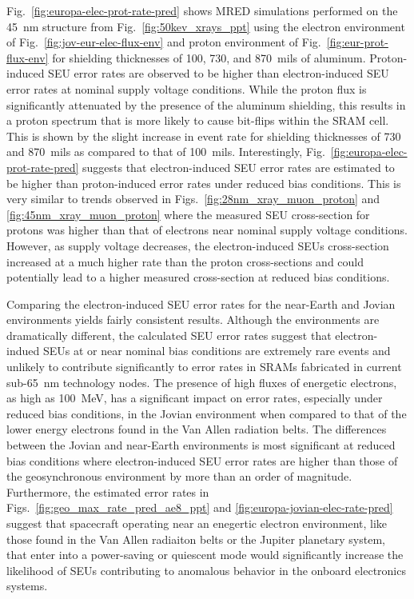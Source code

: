 Fig.~\ref{fig:europa-elec-prot-rate-pred} shows MRED simulations performed on the 45~nm structure from Fig.~\ref{fig:50kev_xrays_ppt} using the electron environment of Fig.~\ref{fig:jov-eur-elec-flux-env} and proton environment of Fig.~\ref{fig:eur-prot-flux-env} for shielding thicknesses of 100, 730, and 870~mils of aluminum.
Proton-induced SEU error rates are observed to be higher than electron-induced SEU error rates at nominal supply voltage conditions. 
While the proton flux is significantly attenuated by the presence of the aluminum shielding, this results in a proton spectrum that is more likely to cause bit-flips within the SRAM cell.
This is shown by the slight increase in event rate for shielding thicknesses of 730 and 870~mils as compared to that of 100~mils.
Interestingly, Fig.~\ref{fig:europa-elec-prot-rate-pred} suggests that electron-induced SEU error rates are estimated to be higher than proton-induced error rates under reduced bias conditions.
This is very similar to trends observed in Figs.~\ref{fig:28nm_xray_muon_proton} and \ref{fig:45nm_xray_muon_proton} where the measured SEU cross-section for protons was higher than that of electrons near nominal supply voltage conditions.
However, as supply voltage decreases, the electron-induced SEUs cross-section increased at a much higher rate than the proton cross-sections and could potentially lead to a higher measured cross-section at reduced bias conditions.

Comparing the electron-induced SEU error rates for the near-Earth and Jovian environments yields fairly consistent results.
Although the environments are dramatically different, the calculated SEU error rates suggest that electron-indued SEUs at or near nominal bias conditions are extremely rare events and unlikely to contribute significantly to error rates in SRAMs fabricated in current sub-65~nm technology nodes.
The presence of high fluxes of energetic electrons, as high as 100~MeV, has a significant impact on error rates, especially under reduced bias conditions, in the Jovian environment when compared to that of the lower energy electrons found in the Van Allen radiation belts.
The differences between the Jovian and near-Earth environments is most significant at reduced bias conditions where electron-induced SEU error rates are higher than those of the geosynchronous environment by more than an order of magnitude.
Furthermore, the estimated error rates in Figs.~\ref{fig:geo_max_rate_pred_ae8_ppt} and \ref{fig:europa-jovian-elec-rate-pred} suggest that spacecraft operating near an enegertic electron environment, like those found in the Van Allen radiaiton belts or the Jupiter planetary system, that enter into a power-saving or quiescent mode would significantly increase the likelihood of SEUs contributing to anomalous behavior in the onboard electronics systems.

